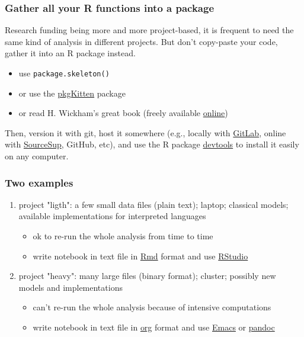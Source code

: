 \documentclass[c]{beamer} %
\begin{document}
\begin{frame}
  \frametitle{Gather all your R functions into a package}
  Research funding being more and more project-based, it is frequent to need the same kind of analysis in different projects.
  But don't copy-paste your code, gather it into an R package instead.
  
  \bigskip
  
  \begin{itemize}
  \item use \texttt{package.skeleton()}
  \item or use the \href{https://cran.r-project.org/package=pkgKitten}{pkgKitten} package
  \item or read H. Wickham's great book (freely available \href{http://r-pkgs.had.co.nz/}{online})
  \end{itemize}
  
  \bigskip
  
  Then, version it with git, host it somewhere (e.g., locally with \href{https://about.gitlab.com/}{GitLab}, online with \href{https://www.renater.fr/fr/SourceSup}{SourceSup}, GitHub, etc), and use the R package \href{https://cran.r-project.org/package=devtools}{devtools} to install it easily on any computer.
\end{frame}

\begin{frame}[fragile]
  \frametitle{Two examples}
  \begin{enumerate}
  \item \alert{project "ligth"}: a few small data files (plain text); laptop; classical models; available implementations for interpreted languages
    \begin{itemize}
    \item ok to re-run the whole analysis from time to time
    \item write notebook in text file in \href{http://cran.r-project.org/web/packages/rmarkdown/index.html}{Rmd} format and use \href{http://www.rstudio.com/products/rstudio/download/}{RStudio}
    \end{itemize}
    \bigskip
    \pause
  \item \alert{project "heavy"}: many large files (binary format); cluster; possibly new models and implementations
    \begin{itemize}
    \item can't re-run the whole analysis because of intensive computations
    \item write notebook in text file in \href{http://orgmode.org/}{org} format and use \href{https://www.gnu.org/software/emacs/}{Emacs} or \href{http://johnmacfarlane.net/pandoc/}{pandoc}
    \end{itemize}
  \end{enumerate}
\end{frame}
\end{document}
